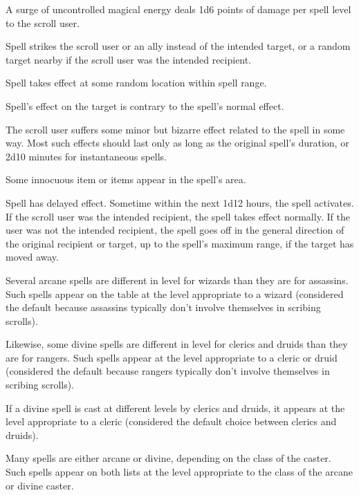 \begin{itemize*}
\item A surge of uncontrolled magical energy deals 1d6 points of damage per spell level to the scroll user.
\item Spell strikes the scroll user or an ally instead of the intended target, or a random target nearby if the scroll user was the intended recipient.
\item Spell takes effect at some random location within spell range.
\item Spell's effect on the target is contrary to the spell's normal effect.
\item The scroll user suffers some minor but bizarre effect related to the spell in some way. Most such effects should last only as long as the original spell's duration, or 2d10 minutes for instantaneous spells.
\item Some innocuous item or items appear in the spell's area.
\item Spell has delayed effect. Sometime within the next 1d12 hours, the spell activates. If the scroll user was the intended recipient, the spell takes effect normally. If the user was not the intended recipient, the spell goes off in the general direction of the original recipient or target, up to the spell's maximum range, if the target has moved away.
\end{itemize*}

Several arcane spells are different in level for wizards than they are for assassins. Such spells appear on the table at the level appropriate to a wizard (considered the default because assassins typically don't involve themselves in scribing scrolls).

Likewise, some divine spells are different in level for clerics and druids than they are for rangers. Such spells appear at the level appropriate to a cleric or druid (considered the default because rangers typically don't involve themselves in scribing scrolls).

If a divine spell is cast at different levels by clerics and druids, it appears at the level appropriate to a cleric (considered the default choice between clerics and druids).

Many spells are either arcane or divine, depending on the class of the caster. Such spells appear on both lists at the level appropriate to the class of the arcane or divine caster.


